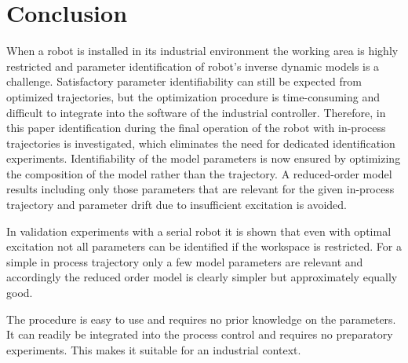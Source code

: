 
\section{Conclusion}
\label{sec:Conclusion}

When a robot is installed in its industrial environment the working area is highly restricted and parameter identification of robot's inverse dynamic models is a challenge. Satisfactory parameter identifiability can still be expected from optimized trajectories, but the optimization procedure is time-consuming and difficult to integrate into the software of the industrial controller. Therefore, in this paper identification during the final operation of the robot with in-process trajectories is investigated, which eliminates the need for dedicated identification experiments. 
Identifiability of the model parameters is now ensured by optimizing the composition of the model rather than the trajectory. A reduced-order model results including only those parameters that are relevant for the given in-process trajectory and parameter drift due to insufficient excitation is avoided.

In validation experiments with a serial robot it is shown that even with optimal excitation not all parameters can be identified if the workspace is restricted. For a simple in process trajectory only a few model parameters are relevant and accordingly the reduced order model is clearly simpler but approximately equally good.

The procedure is easy to use and requires no prior knowledge on the parameters. It can readily be integrated into the process control and requires no preparatory experiments. This makes it suitable for an industrial context.